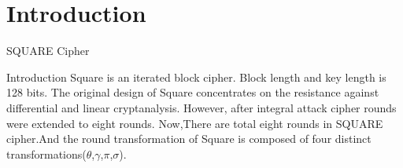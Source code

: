 \section{Introduction}

\begin{frame}{SQUARE Cipher}
  \begin{beamerboxesrounded}{Introduction}
    Square is an iterated block cipher. Block length and key length is 128 bits.
    The original design of Square concentrates on the resistance against differential and linear cryptanalysis. However, after integral attack cipher rounds were extended to eight rounds. Now,There are total eight rounds in SQUARE cipher.And the round transformation of Square is composed of four distinct transformations($\theta$,$\gamma$,$\pi$,$\sigma$).
  \end{beamerboxesrounded}
\end{frame}